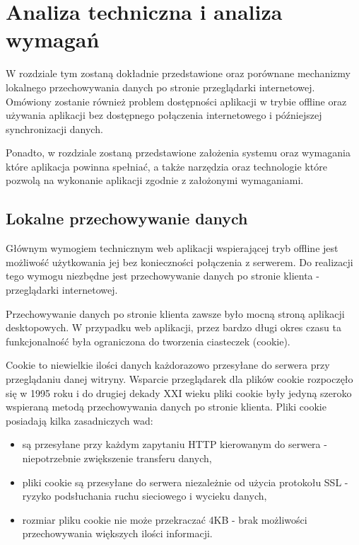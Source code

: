 \chapter{Analiza techniczna i analiza wymagań}
\label{cha:anaTechIAnaWym}

W rozdziale tym zostaną dokładnie przedstawione oraz porównane mechanizmy lokalnego przechowywania danych po stronie przeglądarki internetowej. Omówiony zostanie również problem dostępności aplikacji w trybie offline oraz używania aplikacji bez dostępnego połączenia internetowego i późniejszej synchronizacji danych.

Ponadto, w rozdziale zostaną przedstawione założenia systemu oraz wymagania które aplikacja powinna spełniać, a także narzędzia oraz technologie które pozwolą na wykonanie aplikacji zgodnie z założonymi wymaganiami.

\section{Lokalne przechowywanie danych}
\label{sec:lokPrzechDanych}

Głównym wymogiem technicznym web aplikacji wspierającej tryb offline jest możliwość użytkowania jej bez konieczności połączenia z serwerem. Do realizacji tego wymogu niezbędne jest przechowywanie danych po stronie klienta - przeglądarki internetowej.

Przechowywanie danych po stronie klienta zawsze było mocną stroną aplikacji desktopowych. W przypadku web aplikacji, przez bardzo długi okres czasu ta funkcjonalność była ograniczona do tworzenia ciasteczek (cookie\cite{cookie}).

Cookie to niewielkie ilości danych każdorazowo przesyłane do serwera przy przeglądaniu danej witryny. Wsparcie przeglądarek dla plików cookie rozpoczęło się w 1995 roku i do drugiej dekady XXI wieku pliki cookie były jedyną szeroko wspieraną metodą przechowywania danych po stronie klienta. Pliki cookie posiadają kilka zasadniczych wad:


\begin{itemize}
\item są przesyłane przy każdym zapytaniu HTTP kierowanym do serwera - niepotrzebnie zwiększenie transferu danych,
\item pliki cookie są przesyłane do serwera niezależnie od użycia protokołu SSL - ryzyko podsłuchania ruchu sieciowego i wycieku danych,
\item rozmiar pliku cookie nie może przekraczać 4KB - brak możliwości przechowywania większych ilości informacji.
\end{itemize}

